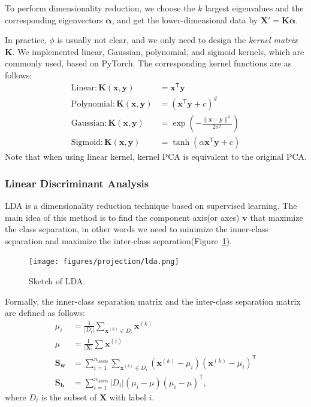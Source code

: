 \documentclass[journal]{IEEEtran}
\begin{document}
To perform dimensionality reduction, we choose the $k$ largest eigenvalues and the corresponding eigenvectors $\boldsymbol \alpha$, and get the lower-dimensional data by $\mathbf X' = \mathbf K \boldsymbol \alpha$.

In practice, $\phi$ is usually not clear, and we only need to design the \textit{kernel matrix} $\mathbf K$. We implemented linear, Gaussian, polynomial, and sigmoid kernels, which are commonly used, based on PyTorch. The corresponding kernel functions are as follows:
\begin{align*}
\textrm{Linear}: \mathbf {K(x,y)} &= \mathbf{x^\mathsf{T} y}\\
\textrm{Polynomial}: \mathbf {K(x,y)} &= (\mathbf{x^\mathsf{T} y}+c)^d\\
\textrm{Gaussian}:\mathbf{K(x,y)} &= \exp(-\frac{\|\mathbf{x-y}\|^2}{2\sigma^2})\\
\textrm{Sigmoid}:\mathbf{K(x,y)} &=\tanh(\alpha \mathbf{x^\mathsf{T} y}+c)
\end{align*}
Note that when using linear kernel, kernel PCA is equivalent to the original PCA.

\subsubsection{Linear Discriminant Analysis}
LDA is a dimensionality reduction technique based on supervised learning. The main idea of this method is to find the component axis(or axes) $\mathbf v$ that maximize the class separation, in other words we need to minimize the inner-class separation and maximize the inter-class separation(Figure~\ref{fig:lda}). 
\begin{figure}[htpb]
  \centering
  \texttt{[image: figures/projection/lda.png]}
  \caption{Sketch of LDA.}
  \label{fig:lda}
\end{figure}

Formally, the inner-class separation matrix and the inter-class separation matrix are defined as follows:
\begin{align*}
\mu_i &= \frac{1}{|D_i|}\sum_{\mathbf x^{(k)}\in D_i}\mathbf x^{(k)}\\
\mu &= \frac{1}{|\mathbf X|}\sum \mathbf x^{(i)}\\
\mathbf {S_w} &= \sum_{i=1}^{n_\mathrm{labels}}\sum_{\mathbf x^{(k)}\in D_i}(\mathbf x^{(k)}-\mu_i)(\mathbf x^{(k)}-\mu_i)^\mathsf{T}\\
\mathbf {S_b} &= \sum_{i=1}^{n_\mathrm{labels}}|D_i|(\mu_i-\mu)(\mu_i-\mu)^\mathsf{T},
\end{align*}
where $D_i$ is the subset of $\mathbf X$ with label $i$.
\end{document}

